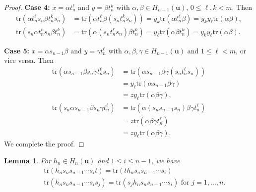 \documentclass[a4paper, oneside]{amsart}
\numberwithin{equation}{section}
\newtheorem{lemma}[equation]{Lemma}
\theoremstyle{definition}
\theoremstyle{remark}
\begin{document}
\begin{proof}
 \textbf{Case 4:} $x=\alpha t_{n}^{\ell}$ and $y=\beta t_n^{k}$ with $\alpha, \beta\in H_{n-1}(\boldsymbol{u})$, $0\leq \ell,k<m$. Then
 \begin{align*}
   \mathrm{tr}(\alpha t_{n}^{\ell}s_n\beta t_n^ks_n)&=\mathrm{tr}(\alpha t_{n}^{\ell}\beta (s_nt_n^ks_n))=y_k\mathrm{tr}(\alpha t_{n}^{\ell}\beta)=y_ky_{\ell}\mathrm{tr}(\alpha\beta),\\
   \mathrm{tr}(s_n\alpha t_{n}^{\ell}s_n\beta t_{n}^k)&=\mathrm{tr}(\alpha (s_nt_n^{\ell}s_n)\beta t_n^{k})=y_{\ell}\mathrm{tr}(\alpha\beta t_n^{k})=y_ky_{\ell}\mathrm{tr}(\alpha\beta).
  \end{align*}

  \textbf{Case 5:} $x=\alpha s_{n-1}\beta$ and $y=\gamma t_n^{\ell}$ with $\alpha,\beta, \gamma\in H_{n-1}(\boldsymbol{u})$ and $1\leq \ell<m$, or vice versa. Then
  \begin{align*}
   \mathrm{tr}(\alpha s_{n-1}\beta s_n\gamma t_{n}^{\ell}s_n)&=\mathrm{tr}(\alpha s_{n-1}\beta \gamma (s_nt_{n}^{\ell}s_n))\\&=y_{\ell}\mathrm{tr}(\alpha s_{n-1}\beta \gamma)\\&=zy_{\ell}\mathrm{tr}(\alpha\beta\gamma),\\
   \mathrm{tr}(s_n\alpha s_{n-1}\beta s_n\gamma t_{n}^{\ell})&=\mathrm{tr}(\alpha (s_n s_{n-1}s_n)\beta\gamma t_n^{\ell})\\&=z\mathrm{tr}(\alpha\beta\gamma t_n^{\ell})\\&=zy_{\ell}\mathrm{tr}(\alpha\beta\gamma).
  \end{align*}
  We complete the proof.
\end{proof}

\begin{lemma}\label{Lemm:Type-II}For $h_{n}\in H_n(\boldsymbol{u})$  and $1\leq i\leq n-1$, we have
\begin{eqnarray*}
 &&\mathrm{tr}(h_{n}s_ns_{n-1}\cdots s_it)=\mathrm{tr}(th_{n}s_ns_{n-1}\cdots s_i)\\
 &&\mathrm{tr}(h_{n}s_ns_{n-1}\cdots s_is_j)=\mathrm{tr}(s_jh_{n}s_ns_{n-1}\cdots s_i) \text{ for }j=1, \ldots, n. \end{eqnarray*}
   \end{lemma}
\end{document}

